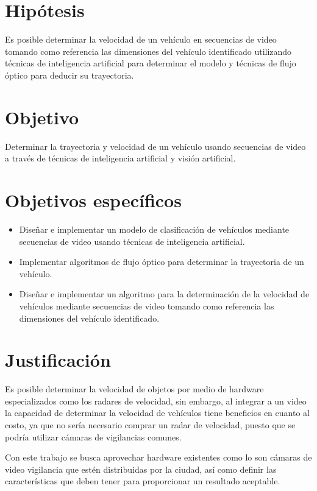 \section{Hipótesis}

Es posible determinar la velocidad de un vehículo en secuencias de video tomando como referencia las dimensiones del vehículo identificado utilizando técnicas de inteligencia artificial para determinar el modelo y técnicas de flujo óptico para deducir su trayectoria.

\section{Objetivo}

Determinar la trayectoria y velocidad de un vehículo usando secuencias de video a través de técnicas de inteligencia artificial y visión artificial.

\section{Objetivos específicos}

\begin{itemize}
\item Diseñar e implementar un modelo de clasificación de vehículos mediante secuencias de video usando técnicas de inteligencia artificial.
\item Implementar algoritmos de flujo óptico para determinar la trayectoria de un vehículo.
\item Diseñar e implementar un algoritmo para la determinación de la velocidad de vehículos mediante secuencias de video tomando como referencia las dimensiones del vehículo identificado.
\end{itemize}

\section{Justificación}

Es posible determinar la velocidad de objetos por medio de hardware especializados como los radares de velocidad, sin embargo, al integrar a un video la capacidad de determinar la velocidad de vehículos tiene beneficios en cuanto al costo, ya que no sería necesario comprar un radar de velocidad, puesto que se podría utilizar cámaras de vigilancias comunes.

Con este trabajo se busca aprovechar hardware existentes como lo son cámaras de video vigilancia que estén distribuidas por la ciudad, así como definir las características que deben tener para proporcionar un resultado aceptable.


